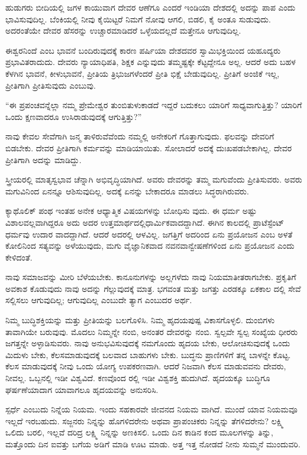 ಹುಡುಗರು ಬೀದಿಯಲ್ಲಿ ಜಗಳ ಕಾಯುವಾಗ ದೇವರ ಆಣೆಗೂ ಎಂದರೆ ಇಂಡಿಯಾ ದೇಶದಲ್ಲಿ ಅದನ್ನು ಪಾಪ ಎಂದು ಭಾವಿಸುವುದಿಲ್ಲ. ಬೆಂಕಿಯಲ್ಲಿ ನೀವು ಕೈಯಿಟ್ಟರೆ ನಿಮಗೆ ನೋವು ಆಗಲಿ, ಬಿಡಲಿ, ಕೈ ಅಂತೂ ಸುಡುವುದು. ಅದರಂತೆಯೇ ದೇವರ ಹೆಸರನ್ನು ಉಚ್ಚಾರಮಾಡಿದರೆ ಒಳ್ಳೆಯದಲ್ಲದೆ ಮತ್ತೇನೂ ಆಗುವುದಿಲ್ಲ.

ಈಶ್ವರನಿಂದೆ  ಎಂಬ ಭಾವನೆ ಬಂದಿರುವುದಕ್ಕೆ ಕಾರಣ ಪರ್ಷಿಯಾ ದೇಶದವರ ಸ್ವಾಮಿಭಕ್ತಿಯಿಂದ ಯಹೂದ್ಯರು ಪ್ರಭಾವಿತರಾದುದು. ದೇವರು ನ್ಯಾಯಾಧಿಪತಿ, ಶಿಕ್ಷಕ ಎನ್ನುವುದು ತಮ್ಮಷ್ಟಕ್ಕೇ ಕೆಟ್ಟದ್ದೇನೂ ಅಲ್ಲ. ಆದರೆ ಅದು ಬಹಳ ಕೆಳಗಿನ ಭಾವನೆ, ಕೀಳುಭಾವನೆ, ಪ್ರೀತಿಯ ತ್ರಿಭುಜಗಳೆಂದರೆ ಪ್ರೀತಿ ಭಿಕ್ಷೆ ಬೇಡುವುದಿಲ್ಲ. ಪ್ರೀತಿಗೆ ಅಂಜಿಕೆ ಇಲ್ಲ, ಪ್ರೀತಿಗಾಗಿ ಪ್ರೀತಿಸುವುದು ಎಂಬುವು.

“ಈ ಪ್ರಪಂಚವನ್ನೆಲ್ಲಾ ನಮ್ಮ ಪ್ರೇಮೇಶ್ವರ ತುಂಬಿತುಳುಕಾಡದೆ ಇದ್ದರೆ ಬದುಕಲು ಯಾರಿಗೆ ಸಾಧ್ಯವಾಗುತ್ತಿತ್ತು? ಯಾರಿಗೆ ಒಂದು ಕ್ಷಣವಾದರೂ ಉಸಿರಾಡುವುದಕ್ಕೆ ಆಗುತ್ತಿತ್ತು?”

ನಾವು ಕೇವಲ ಸೇವೆಗಾಗಿ ಜನ್ಮ ತಾಳಿರುವೆವೆಂದು ನಮ್ಮಲ್ಲಿ ಅನೇಕರಿಗೆ ಗೊತ್ತಾಗುವುದು. ಫಲವನ್ನು ದೇವರಿಗೆ ಬಿಡಬೇಕು. ದೇವರ ಪ್ರೀತಿಗಾಗಿ ಕರ್ಮವನ್ನು ಮಾಡಿಯಾಯಿತು. ಸೋಲಾದರೆ ಅದಕ್ಕೆ ದುಃಖಪಡಬೇಕಾಗಿಲ್ಲ. ದೇವರ ಪ್ರೀತಿಗಾಗಿ ಅದನ್ನು ಮಾಡಿದ್ದು.

ಸ್ತ್ರೀಯರಲ್ಲಿ ಮಾತೃಸ್ವಭಾವ ಚೆನ್ನಾಗಿ ಅಭಿವೃದ್ಧಿಯಾಗಿದೆ. ಅವರು ದೇವರನ್ನು ತಮ್ಮ ಮಗುವೆಂದು ಪ್ರೀತಿಸುವರು. ಅವರು ಮಗುವಿನಿಂದ ಏನನ್ನೂ ಆಶಿಸುವುದಿಲ್ಲ. ಅದಕ್ಕೆ ಏನನ್ನು ಬೇಕಾದರೂ ಮಾಡಲು ಸಿದ್ಧರಾಗಿರುವರು.

ಕ್ಯಾಥೊಲಿಕ್​ ಪಂಥ ಇಂತಹ ಅನೇಕ ಆಧ್ಯಾತ್ಮಿಕ ವಿಷಯಗಳನ್ನು ಬೋಧಿಸು ವುದು. ಈ ಧರ್ಮ ಅಷ್ಟು ವಿಶಾಲವಲ್ಲವಾಗಿದ್ದರೂ ಅದು ಅದರ ಉತ್ತಮಾರ್ಥದಲ್ಲಿಧಾರ್ಮಿಕವಾದದ್ದಾಗಿದೆ. ಈಗಿನ ಕಾಲದಲ್ಲಿ ಪ್ರಾಟೆಸ್ಟೆಂಟ್​ ಧರ್ಮವು ಉದಾರ ವಾದದ್ದಾಗಿದೆ. ಆದರೆ ಅದರಲ್ಲಿ ಆಳವಿಲ್ಲ. ಜಗತ್ತಿಗೆ ಅದರಿಂದ ಏನು ಪ್ರಯೋಜನ ಎಂಬ ಅಳತೆ ಕೋಲಿನಿಂದ ಸತ್ಯವನ್ನು ಅಳೆಯುವುದು, ಮಗು ವೈಜ್ಞಾನಿಕವಾದ ನವನವಾನ್ವೇಷಣೆಗಳಿಂದ ಏನು ಪ್ರಯೋಜನ ಎಂದು ಕೇಳಿದಂತೆ.

ನಾವು ಸಮಾಜವನ್ನು ಮೀರಿ ಬೆಳೆಯಬೇಕು. ಕಾನೂನುಗಳನ್ನು ಅಲ್ಲಗಳೆದು ನಾವು ನಿಯಮಾತೀತರಾಗಬೇಕು. ಪ್ರಕೃತಿಗೆ ಅವಕಾಶ ಕೊಡುವುದು ನಾವು ಅದನ್ನು ಗೆಲ್ಲುವುದಕ್ಕೆ ಮಾತ್ರ. ಭಗವಂತ ಮತ್ತು ಜಗತ್ತು ಎರಡಕ್ಕೂ ಏಕಕಾಲ ದಲ್ಲಿ ಸೇವೆ ಸಲ್ಲಿಸಲು ಆಗುವುದಿಲ್ಲ; ಆಗುವುದಿಲ್ಲ ಎಂಬುದೇ ತ್ಯಾಗ ಎಂಬುದರ ಅರ್ಥ.

ನಿಮ್ಮ ಬುದ್ಧಿಶಕ್ತಿಯನ್ನು ಮತ್ತು ಪ್ರೀತಿಯನ್ನು ಬಲಗೊಳಿಸಿ. ನಿಮ್ಮ ಹೃದಯಪುಷ್ಪ ವಿಕಾಸಗೊಳ್ಳಲಿ. ದುಂಬಿಗಳು ತಾವಾಗಿಯೇ ಬರುವುವು. ಮೊದಲು ನಿಮ್ಮನ್ನೇ ನಂಬಿ, ಅನಂತರ ದೇವರನ್ನು ನಂಬಿ. ಸ್ವಲ್ಪವೇ ಸ್ವಲ್ಪ ಸಂಖ್ಯೆಯ ಧೀರರು ಜಗತ್ತನ್ನೇ ಅಳ್ಳಾಡಿಸುವರು. ನಾವು ಅನುಭವಿಸುವುದಕ್ಕೆ ನಮಗೊಂದು ಹೃದಯ ಬೇಕು, ಆಲೋಚಿಸುವುದಕ್ಕೆ ಒಂದು ಮಿದುಳು ಬೇಕು, ಕೆಲಸಮಾಡುವುದಕ್ಕೆ ಬಲವಾದ ಬಾಹುಗಳು ಬೇಕು. ಬುದ್ಧನು ಪ್ರಾಣಿಗಳಿಗೆ ತನ್ನ ಬಾಳನ್ನೇ ಕೊಟ್ಟ. ಕೆಲಸ ಮಾಡುವುದಕ್ಕೆ ನೀವು ಒಂದು ಯೋಗ್ಯ ಉಪಕರಣವಾಗಿ. ಆದರೆ ನಿಜವಾಗಿ ಕೆಲಸ ಮಾಡುವವನು ದೇವರು, ನೀವಲ್ಲ. ಒಬ್ಬನಲ್ಲಿ ಇಡೀ ವಿಶ್ವವಿದೆ. ಕಣವೊಂದ ರಲ್ಲಿ ಇಡೀ ವಿಶ್ವಶಕ್ತಿ ಹುದುಗಿದೆ. ಹೃದಯಕ್ಕೂ ಬುದ್ಧಿಗೂ ಘರ್ಷಣೆಯಾದಾಗ ಯಾವಾಗಲೂ ಹೃದಯವನ್ನು ಅನುಸರಿಸಿ.

ಸ್ಪರ್ಧೆ ಎಂಬುದು ನಿನ್ನೆಯ ನಿಯಮ. ಇಂದು ಸಹಕಾರವೇ ಜೀವನದ ನಿಯಮ ವಾಗಿದೆ. ಮುಂದೆ ಯಾವ ನಿಯಮವೂ ಇಲ್ಲದೆ ಇರಬಹುದು. ಸಜ್ಜನರು ನಿನ್ನನ್ನು ಹೊಗಳಿದರೇನು ಅಥವಾ ಪ್ರಾಪಂಚಿಕರು ನಿನ್ನನ್ನು ತೆಗಳಿದರೇನು? ಲಕ್ಷ್ಮಿ ಒಲಿದು ಬರಲಿ, ಇಲ್ಲವೆ ದರಿದ್ರ ಲಕ್ಷ್ಮಿ ನಿನ್ನನ್ನು ಅಣಕಿಸಲಿ. ಒಂದು ದಿನ ಕಾಡಿನ ಕಂದ ಮೂಲಗಳನ್ನು ತಿನ್ನು, ಮತ್ತೊಂದು ದಿನ ಐವತ್ತು ಬಗೆಯ ಅಡಿಗೆ ಮಾಡಿ ಊಟ ಮಾಡು. ಅತ್ತ ಇತ್ತ ನೋಡದೆ ನೀನು ಸುಮ್ಮನೆ ಮುಂದುವರಿ.

